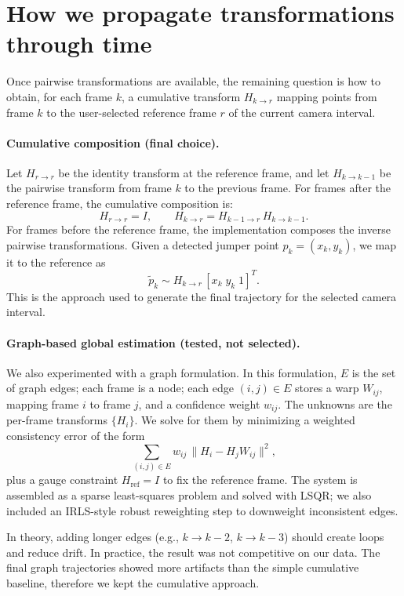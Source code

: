 \section{How we propagate transformations through time}
Once pairwise transformations are available, the remaining question is how to obtain, for each frame \(k\), a cumulative transform \(H_{k\rightarrow r}\) mapping points from frame \(k\) to the user-selected reference frame \(r\) of the current camera interval.

\paragraph{Cumulative composition (final choice).}
Let \(H_{r\rightarrow r}\) be the identity transform at the reference frame, and let \(H_{k\rightarrow k-1}\) be the pairwise transform from frame \(k\) to the previous frame. For frames after the reference frame, the cumulative composition is:
\[
H_{r\rightarrow r} = I,\qquad
H_{k\rightarrow r} = H_{k-1\rightarrow r}\,H_{k\rightarrow k-1}.
\]
For frames before the reference frame, the implementation composes the inverse pairwise transformations. Given a detected jumper point \(p_k = (x_k,y_k)\), we map it to the reference as
\[
\tilde p_k \sim H_{k\rightarrow r}\,[x_k\; y_k\; 1]^T.
\]
This is the approach used to generate the final trajectory for the selected camera interval.

\paragraph{Graph-based global estimation (tested, not selected).}
We also experimented with a graph formulation. In this formulation, \(E\) is the set of graph edges; each frame is a node; each edge \((i,j)\in E\) stores a warp \(W_{ij}\), mapping frame \(i\) to frame \(j\), and a confidence weight \(w_{ij}\). The unknowns are the per-frame transforms \(\{H_i\}\). We solve for them by minimizing a weighted consistency error of the form
\[
\sum_{(i,j)\in E} w_{ij}\,\lVert H_i - H_j W_{ij}\rVert^2,
\]
plus a gauge constraint \(H_{\text{ref}} = I\) to fix the reference frame. The system is assembled as a sparse least-squares problem and solved with LSQR; we also included an IRLS-style robust reweighting step to downweight inconsistent edges.

In theory, adding longer edges (e.g., $k\rightarrow k-2$, $k\rightarrow k-3$) should create loops and reduce drift. In practice, the result was not competitive on our data. The final graph trajectories showed more artifacts than the simple cumulative baseline, therefore we kept the cumulative approach.

